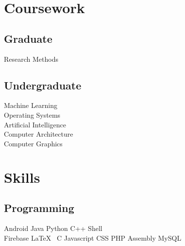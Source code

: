 \documentclass[letterpaper]{deedy-resume} %
\begin{document}
\begin{minipage}[t]{0.33\textwidth}
\sectionspace %


\section{Coursework}

\subsection{Graduate}

Research Methods \\


\sectionspace %


\subsection{Undergraduate}

Machine Learning \\
Operating Systems \\
Artificial Intelligence \\
Computer Architecture \\
Computer Graphics\\

\sectionspace %


\section{Skills}

\subsection{Programming}

Android \textbullet{} Java \textbullet{} Python \textbullet{} C++ \textbullet{} Shell \\
Firebase \textbullet{} \LaTeX\  \textbullet{}
C \textbullet{} Javascript \textbullet{} CSS \textbullet{} PHP \textbullet{} Assembly 
\textbullet{} MySQL

\sectionspace %


\end{minipage} %
\end{document}
